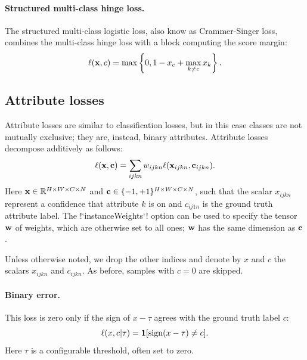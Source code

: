 \paragraph{Structured multi-class hinge loss.} The structured multi-class logistic loss, also know as Crammer-Singer loss, combines the multi-class hinge loss with a block computing the score margin:
\begin{equation}\label{e:loss-structuredmulticlasshinge}
	\ell(\mathbf{x}, c) = \max\left\{0, 1 - x_c + \max_{k \not= c} x_k\right\}.
\end{equation}

\subsection{Attribute losses}\label{s:loss-attributes}

Attribute losses are similar to classification losses, but in this case classes are not mutually exclusive; they are, instead, binary attributes. Attribute losses decompose additively as follows:
\begin{equation}\label{e:addlossattribute}	
\ell(\mathbf{x},\mathbf{c}) = \sum_{ijkn} w_{ijkn} \ell(\mathbf{x}_{ijkn}, \mathbf{c}_{ijkn}).
\end{equation}
Here $\mathbf{x}\in \mathbb{R}^{H \times W \times C \times N}$ and $\mathbf{c} \in \{-1,+1\}^{H \times W \times C \times N}$, such that the scalar $x_{ijkn}$ represent a confidence that attribute $k$ is on and $c_{ij1n}$ is the ground truth attribute label. The !`instanceWeights`! option can be used to specify the tensor $\mathbf{w}$ of weights, which are otherwise set to all ones; $\mathbf{w}$ has the same dimension as $\mathbf{c}$.

 Unless otherwise noted, we drop the other indices and denote by $x$ and $c$  the scalars $x_{ijkn}$ and  $c_{ijkn}$. As before, samples with $c=0$ are skipped.

\paragraph{Binary error.} This loss is zero only if the sign of $x - \tau$ agrees with the ground truth label $c$:
\begin{equation}\label{e:loss-binary}
 \ell(x,c|\tau) = \mathbf{1}[\sign(x-\tau) \not= c].
\end{equation}
Here $\tau$ is a configurable threshold, often set to zero.

